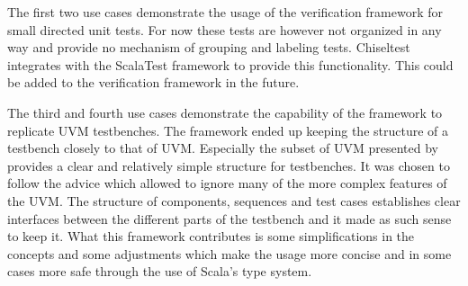 
The first two use cases demonstrate the usage of the verification framework for small directed unit tests. For now these tests are however not organized in any way and provide no mechanism of grouping and labeling tests. Chiseltest integrates with the ScalaTest framework to provide this functionality. This could be added to the verification framework in the future.


The third and fourth use cases demonstrate the capability of the framework to replicate UVM testbenches. The framework ended up keeping the structure of a testbench closely to that of UVM. Especially the subset of UVM presented by \citeauthor{sutherland2015uvm} \cite{sutherland2015uvm} provides a clear and relatively simple structure for testbenches. It was chosen to follow the advice which allowed to ignore many of the more complex features of the UVM. The structure of components, sequences and test cases establishes clear interfaces between the different parts of the testbench and it made as such sense to keep it. What this framework contributes is some simplifications in the concepts and some adjustments which make the usage more concise and in some cases more safe through the use of Scala's type system.

